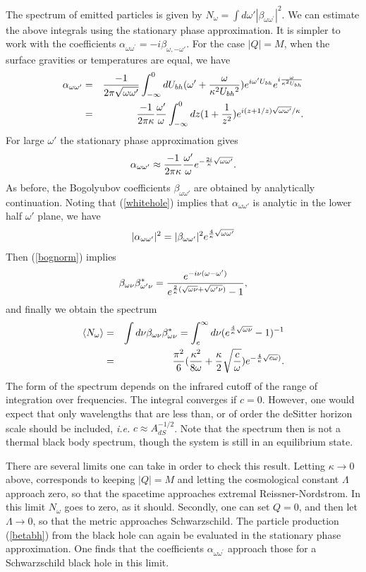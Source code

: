 \documentclass[12pt]{article}
\newcommand{\be}{\begin{equation}}
\newcommand{\ee}{\end{equation}}
\def\bena{\begin{eqnarray}}
\def\eena{\end{eqnarray}}
\def\alp{\alpha _{\omega \omega '}}
\def\bet{\beta_{\omega\omega '}}
\def\ubh{U_{bh}}
\def\bwwp{\beta_{\omega\omega^\prime}}
\def\awwp{\alpha_{\omega\omega^\prime}}
\def\nw{N_\omega}
\begin{document}
The spectrum of emitted particles is given by $\nw =\int d\omega '
|\bwwp |^2 $. We can estimate the above integrals using the stationary
phase approximation. It is simpler to work with the coefficients
$\awwp =-i\beta _{\omega ,-\omega '}$.
For the case $|Q|=M$, when the surface gravities or temperatures are equal,
we have
%
\bena\label{rndsalp}\alp &= &{-1\over 2\pi \sqrt{\omega \omega '}}
\int_{-\infty}^0 d\ubh (\omega ' +{\omega \over \kappa^2 \ubh {}^2 } )
 e^{i\omega' \ubh} e ^{i {\omega \over \kappa ^2 \ubh} } \\
&=&{-1\over 2\pi \kappa}{\omega ' \over \omega }\int_{-\infty}^0 dz
(1 +{1\over z^2}) e^{i(z+1/z)\sqrt{\omega\omega ' }/\kappa}. \eena
%
For large $\omega '$ the stationary
phase approximation gives
%
\be\label{cando}
\alp  \approx {-1\over 2\pi\kappa} {\omega '\over \omega }
e^{-{2i\over \kappa}\sqrt{\omega\omega '} }.\ee
%
As before, the Bogolyubov coefficients $\bet$ are obtained
by analytically continuation. Noting that (\ref{whitehole}) implies that $\alp$
is analytic in the lower half $\omega '$ plane, we have
%
\be\label{rndsratio} |\alp |^2 =|\bet |^2 e^{{4\over
\kappa}\sqrt{\omega\omega '} } \ee
%
Then (\ref{bognorm}) implies
%
\be\label{betbet}\beta _{\omega\nu}\beta^*_{\omega ' \nu}  =
{e^{-i\nu(\omega -\omega ') }\over
e^{{2\over \kappa} (\sqrt{\omega\nu} +\sqrt{\omega '\nu})} -1 },\ee
%
and finally we obtain the spectrum
%
\bena\label{rndsspec}\langle N_\omega \rangle&=&\int d\nu \beta _{\omega\nu}\beta^*_{\omega
\nu} = \int _c^{\infty}d\nu ( e^{{4\over \kappa} \sqrt{\omega\nu} } -1 )^{-1} \\
&= &{\pi^2\over 6} ({\kappa ^2 \over 8\omega }+ {\kappa \over
2}\sqrt{c\over\omega} )
e^{-{4\over \kappa}\sqrt{c\omega})} .\eena
%
The form of the spectrum depends on the infrared cutoff of the range of
integration over frequencies. The integral converges if $c=0$. However,
one would expect that only wavelengths that are less than, or of order
the deSitter horizon scale should be included, {\it i.e.} $c\approx
A^{-1/2}_{dS}$.
Note that the spectrum then is not a thermal black body spectrum, though
the system is still
in an equilibrium state.

There are several limits one can take in order to check this result. Letting
$\kappa \rightarrow 0$ above, corresponds to keeping
$|Q|=M$ and letting the cosmological constant
$\Lambda$ approach zero, so that the spacetime approaches
extremal Reissner-Nordstrom. In this limit $N_{\omega}$ goes to zero,
as it should. Secondly, one can set $Q=0$, and then
let $\Lambda\rightarrow 0$, so that the metric approaches Schwarzschild.
The particle production (\ref{betabh}) from the black hole can again
be evaluated in the stationary phase approximation. One finds that
the coefficients $\awwp$ approach those for a Schwarzschild black hole in
this limit.
\end{document}
